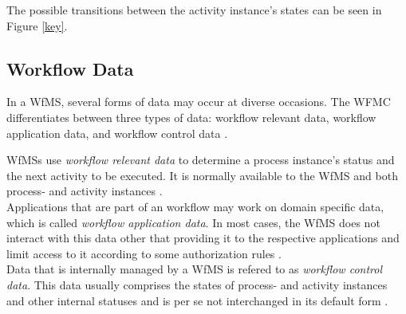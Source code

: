     The possible transitions between the activity instance's states can be seen in Figure \ref{key}.

  \subsection{Workflow Data} %
  \label{sub:workflow_data}
    In a \ac{WfMS}, several forms of data may occur at diverse occasions. The \ac{WFMC} differentiates between three types of data: workflow relevant data, workflow application data, and workflow control data \cite{Hollingsworth1995Wfmc}.

    \acp{WfMS} use \emph{workflow relevant data} to determine a process instance's status and the next activity to be executed. It is normally available to the \ac{WfMS} and both process- and activity instances \cite{Hollingsworth1995Wfmc}. \\
    Applications that are part of an workflow may work on domain specific data, which is called \emph{workflow application data}. In most cases, the \ac{WfMS} does not interact with this data other that providing it to the respective applications and limit access to it according to some authorization rules \cite{Hollingsworth1995Wfmc,Casati1999Specification}. \\
    Data that is internally managed by a \ac{WfMS} is refered to as \emph{workflow control data}. This data usually comprises the states of process- and activity instances and other internal statuses and is per se not interchanged in its default form \cite{Hollingsworth1995Wfmc,Casati1999Specification}.

